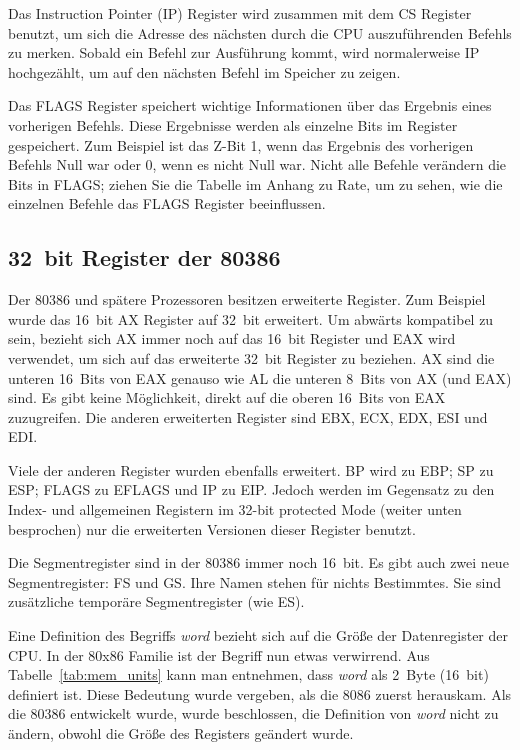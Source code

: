 Das Instruction Pointer (IP)  Register wird
zusammen mit dem CS Register benutzt, um sich die Adresse des
n\"{a}chsten durch die CPU auszuf\"{u}hrenden Befehls zu merken. Sobald ein
Befehl zur Ausf\"{u}hrung kommt, wird normalerweise IP hochgez\"{a}hlt, um
auf den n\"{a}chsten Befehl im Speicher zu zeigen.

Das FLAGS  Register speichert wichtige
Informationen \"{u}ber das Ergebnis eines vorherigen Befehls. Diese
Ergebnisse werden als einzelne Bits im Register gespeichert. Zum
Beispiel ist das Z-Bit 1, wenn das Ergebnis des vorherigen Befehls
Null war oder 0, wenn es nicht Null war. Nicht alle Befehle
ver\"{a}ndern die Bits in FLAGS; ziehen Sie die Tabelle im Anhang zu
Rate, um zu sehen, wie die einzelnen Befehle das FLAGS Register
beeinflussen.

\subsection{32~bit Register der 80386}

Der 80386 und sp\"{a}tere Prozessoren besitzen erweiterte Register. Zum
Beispiel wurde das 16~bit AX Register auf 32~bit erweitert. Um
abw\"{a}rts kompatibel zu sein, bezieht sich AX immer noch auf das
16~bit Register und EAX wird verwendet, um sich auf das erweiterte
32~bit Register zu beziehen. AX sind die unteren 16~Bits von EAX
genauso wie AL die unteren 8~Bits von AX (und EAX) sind. Es gibt
keine M\"{o}glichkeit, direkt auf die oberen 16~Bits von EAX
zuzugreifen. Die anderen erweiterten Register sind EBX, ECX, EDX,
ESI und EDI\@.

Viele der anderen Register wurden ebenfalls erweitert. BP wird zu
EBP;   SP zu ESP;
  FLAGS zu
EFLAGS und IP zu EIP\@. 
Jedoch werden im Gegensatz zu den Index- und allgemeinen Registern
im 32-bit protected Mode (weiter unten besprochen) nur die
erweiterten Versionen dieser Register benutzt.

Die Segmentregister sind in der 80386 immer noch 16~bit. Es gibt
auch zwei neue Segmentregister: FS und GS.
Ihre Namen stehen f\"{u}r nichts Bestimmtes. Sie sind zus\"{a}tzliche
tempor\"{a}re Segmentregister (wie ES).

Eine Definition des Begriffs  \emph{word}  bezieht sich
auf die Gr\"{o}{\ss}e der Datenregister der CPU\@. In der 80x86 Familie ist
der Begriff nun etwas verwirrend. Aus Tabelle~\ref{tab:mem_units}
kann man entnehmen, dass \emph{word} als 2~Byte (16~bit) definiert
ist. Diese Bedeutung wurde vergeben, als die 8086 zuerst herauskam.
Als die 80386 entwickelt wurde, wurde beschlossen, die Definition
von \emph{word} nicht zu \"{a}ndern, obwohl die Gr\"{o}{\ss}e des Registers
ge\"{a}ndert wurde. 

